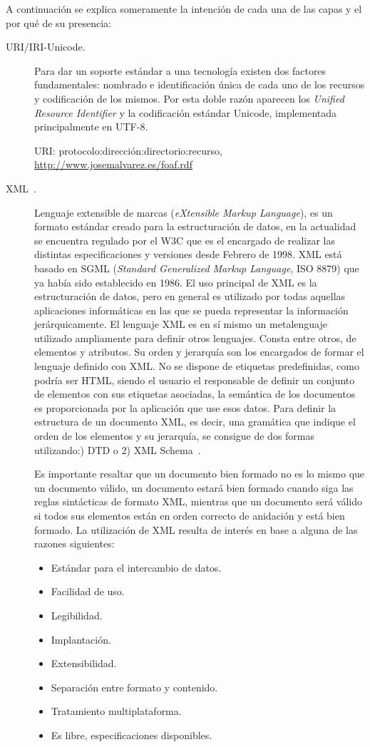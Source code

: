 A continuación se explica someramente la intención de cada una de las capas y el por qué
de su presencia:
\begin{description}
\item[\gls{URI}/\gls{IRI}-Unicode.] Para dar un soporte estándar a una tecnología existen
dos factores fundamentales: nombrado e identificación única de cada uno de los
recursos y codificación de los mismos. Por esta doble razón aparecen los \textit{Unified
Resource Identifier} y la codificación estándar Unicode, implementada principalmente en UTF-8.
\begin{example}
URI: protocolo:dirección:directorio:recurso, \url{http://www.josemalvarez.es/foaf.rdf}
\end{example}

\item[\gls{XML}~\cite{XML11}.] Lenguaje extensible de marcas (\textit{eXtensible Markup
Language}), es un formato estándar creado para la estructuración de datos, en la actualidad 
se encuentra regulado por el \gls{W3C} que es el encargado de realizar las distintas
especificaciones y versiones desde Febrero de 1998. XML está basado en \gls{SGML}
(\textit{Standard Generalized Markup Language}, ISO 8879) que ya había sido establecido
en 1986. El uso principal de XML es la estructuración de datos, pero en general es utilizado por todas
aquellas aplicaciones informáticas en las que se pueda representar la información jerárquicamente.
El lenguaje XML es en sí mismo un metalenguaje utilizado ampliamente para definir otros
lenguajes. Consta entre otros, de elementos y atributos. Su orden y jerarquía
son los encargados de formar el lenguaje definido con XML. No se dispone de etiquetas predefinidas, como podría ser \gls{HTML}, siendo el 
usuario el responsable de definir un conjunto de elementos con sus
etiquetas asociadas, la semántica de los documentos es proporcionada por la aplicación que use
esos datos. Para definir la estructura de un documento XML, es decir, una 
gramática que indique el orden de los elementos y su jerarquía, se consigue de dos formas utilizando:) \gls{DTD} o 2) \gls{XML Schema}~\cite{XMLSchema}.

Es importante resaltar que un documento bien formado no es lo mismo que un documento
válido, un documento estará bien formado cuando siga las reglas sintácticas de
formato XML, mientras que un documento será válido si todos sus elementos están en orden correcto de anidación y está bien formado. 
La utilización de XML resulta de interés en base a alguna de las razones siguientes:
\begin{itemize}
\item Estándar para el intercambio de datos.
\item Facilidad de uso.
\item Legibilidad.
\item Implantación.
\item Extensibilidad.
\item Separación entre formato y contenido.
\item Tratamiento multiplataforma.
\item Es libre, especificaciones disponibles. 
\end{itemize}


\end{description}
